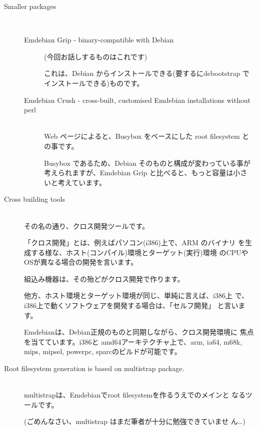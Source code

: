\documentclass[mingoth,a4paper]{jsarticle}
\begin{document}
\begin{description}
 \item[Smaller packages]\mbox{}\\
  \begin{description}
   \item[Emdebian Grip - binary-compatible with Debian](今回お話しするものはこれです)

              これは、Debian からインストールできる(要するにdebootstrap でインストールできる)ものです。
   \item[Emdebian Crush - cross-built, customised Emdebian installations without perl]\mbox{}\\
              Web ページによると、Busybox をベースにした root filesystem
              との事です。

              Busybox であるため、Debian そのものと構成が変わっている事が
              考えられますが、Emdebian Grip と比べると、もっと容量は小さ
              いと考えています。
  \end{description}

 \item[Cross building tools]\mbox{}\\
            その名の通り、クロス開発ツールです。

            「クロス開発」とは、例えばパソコン(i386)上で、ARM のバイナリ
            を生成する様な、ホスト(コンパイル)環境とターゲット(実行)環境
            のCPUやOSが異なる場合の開発を言います。

            組込み機器は、その殆どがクロス開発で作ります。

            他方、ホスト環境とターゲット環境が同じ、単純に言えば、i386上
            で、i386上で動くソフトウェアを開発する場合は、「セルフ開発」
            と言います。

            Emdebianは、Debian正規のものと同期しながら、クロス開発環境に
            焦点を当てています。i386と amd64アーキテクチャ上で、arm,
            ia64, m68k, mips, mipsel, powerpc, sparcのビルドが可能です。
 \item[Root filesystem generation is based on multistrap package.]\mbox{}\\
            multistrapは、Emdebianでroot filesystemを作るうえでのメインと
            なるツールです。

            (ごめんなさい、multistrap はまだ筆者が十分に勉強できていませ
            ん…)
\end{description}
\end{document}
